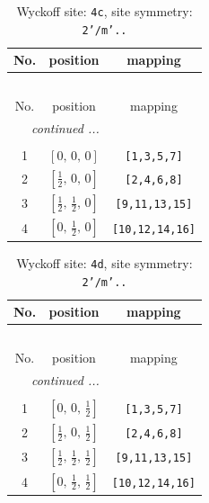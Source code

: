 \documentclass[fleqn,8pt]{jsarticle}
\begin{document}
\renewcommand{\arraystretch}{1.2}
\begin{longtable}{ccc}
\caption{Wyckoff site: {\tt 4c}, site symmetry: {\tt 2'/m'..}}
 \\
 \hline \hline
No. & position & mapping \\ \hline \endfirsthead

\multicolumn{2}{l}{\tablename\ \thetable{}} \\
 \hline \hline
No. & position & mapping \\ \hline \endhead

 \hline \hline
\multicolumn{2}{r}{\footnotesize\it continued ...} \\ \endfoot

 \hline \hline
\multicolumn{2}{r}{} \\ \endlastfoot

1 & $\left[ 0,\, 0,\, 0 \right]$ & {\tt [1,3,5,7]} \\ \hline
2 & $\left[ \frac{1}{2},\, 0,\, 0 \right]$ & {\tt [2,4,6,8]} \\ \hline
3 & $\left[ \frac{1}{2},\, \frac{1}{2},\, 0 \right]$ & {\tt [9,11,13,15]} \\ \hline
4 & $\left[ 0,\, \frac{1}{2},\, 0 \right]$ & {\tt [10,12,14,16]} \\
\end{longtable}
\renewcommand{\arraystretch}{1.2}
\begin{longtable}{ccc}
\caption{Wyckoff site: {\tt 4d}, site symmetry: {\tt 2'/m'..}}
 \\
 \hline \hline
No. & position & mapping \\ \hline \endfirsthead

\multicolumn{2}{l}{\tablename\ \thetable{}} \\
 \hline \hline
No. & position & mapping \\ \hline \endhead

 \hline \hline
\multicolumn{2}{r}{\footnotesize\it continued ...} \\ \endfoot

 \hline \hline
\multicolumn{2}{r}{} \\ \endlastfoot

1 & $\left[ 0,\, 0,\, \frac{1}{2} \right]$ & {\tt [1,3,5,7]} \\ \hline
2 & $\left[ \frac{1}{2},\, 0,\, \frac{1}{2} \right]$ & {\tt [2,4,6,8]} \\ \hline
3 & $\left[ \frac{1}{2},\, \frac{1}{2},\, \frac{1}{2} \right]$ & {\tt [9,11,13,15]} \\ \hline
4 & $\left[ 0,\, \frac{1}{2},\, \frac{1}{2} \right]$ & {\tt [10,12,14,16]} \\
\end{longtable}
\end{document}
